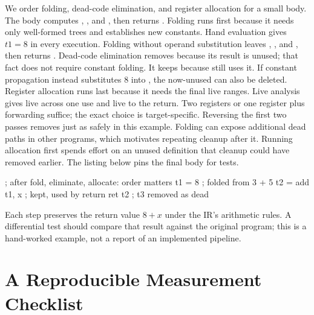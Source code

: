 We order folding, dead-code elimination, and register allocation for a small body.
The body computes , , and , then returns .
Folding runs first because it needs only well-formed trees and establishes new constants.
Hand evaluation gives $t1 = 8$ in every execution.
Folding without operand substitution leaves , , and , then returns .
Dead-code elimination removes  because its result is unused; that fact does not require constant folding.
It keeps  because  still uses it.
If constant propagation instead substitutes $8$ into , the now-unused  can also be deleted.
Register allocation runs last because it needs the final live ranges.
Live analysis gives  live across one use and  live to the return.
Two registers or one register plus forwarding suffice; the exact choice is target-specific.
Reversing the first two passes removes  just as safely in this example.
Folding can expose additional dead paths in other programs, which motivates repeating cleanup after it.
Running allocation first spends effort on an unused definition that cleanup could have removed earlier.
The listing below pins the final body for tests.
\begin{irlisting}
; after fold, eliminate, allocate: order matters
t1 = 8            ; folded from 3 + 5
t2 = add t1, x    ; kept, used by return
ret t2            ; t3 removed as dead
\end{irlisting}
Each step preserves the return value $8+x$ under the IR's arithmetic rules.
A differential test should compare that result against the original program; this is a hand-worked example, not a report of an implemented pipeline.

\section{A Reproducible Measurement Checklist}\label{sec:ch38-checklist}

